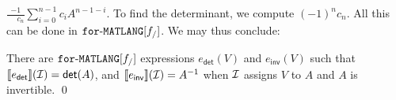 $\frac{-1}{\phantom{-1}c_n}\sum_{i=0}^{n-1}c_i A^{n-1-i}$. To find the determinant,
we compute $(-1)^nc_n$. All this can be done in $\texttt{for}\text{-}\texttt{MATLANG}[f_/]$.
We may thus conclude:
\begin{proposition}\label{prop:inverse}
There are $\texttt{for}\text{-}\texttt{MATLANG}[f_/]$ expressions $e_{\mathsf{det}}(V)$ and $e_{\mathsf{inv}}(V)$ such that
$\llbracket e_{\mathsf{det}} \rrbracket(\mathcal{I})=\mathsf{det}(A)$, and  
$\llbracket e_{\mathsf{inv}} \rrbracket(\mathcal{I})=A^{-1}$ when $\mathcal{I}$ assigns $V$
to $A$ and $A$ is invertible.
\qed
\end{proposition}
%


%
%
%

%

%


